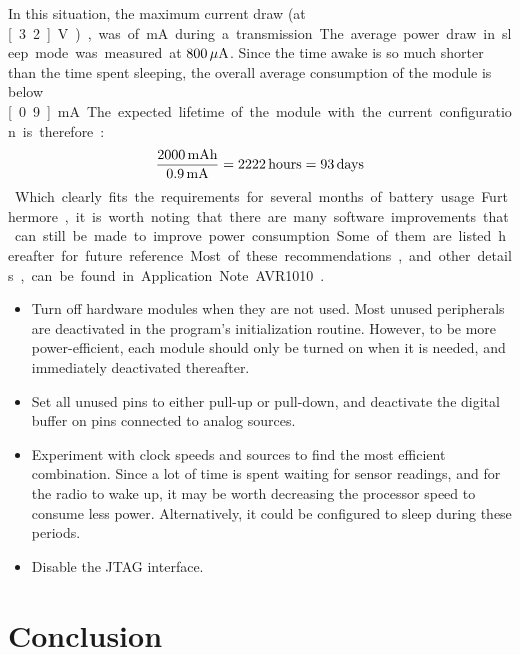 In this situation, the maximum current draw (at \unit[3.2]{V}), was of
\unit[20]{mA} during a transmission. The average power draw in sleep mode was
measured at $\unit[800]{\mu{}A}$. Since the time awake is so much shorter than
the time spent sleeping, the overall average consumption of the module is below
\unit[0.9]{mA}. The expected lifetime of the module with the current
configuration is therefore : 

\begin{equation}
  \frac{\unit[2000]{mAh}}{\unit[0.9]{mA}} = \unit[2222]{hours} = \unit[93]{days}
  \label{eq:env-sensors-consumption}
\end{equation}

Which clearly fits the requirements for several months of battery usage.
Furthermore, it is worth noting that there are many software improvements that
can still be made to improve power consumption. Some of them are listed
hereafter for
future reference. Most of these recommendations, and other details, can be found
in Application Note AVR1010\cite{avr1010}.

\begin{itemize}
  \item Turn off hardware modules when they are not used. Most unused
    peripherals are deactivated in the program's initialization routine.
    However, to be more power-efficient, each module should only be turned on
    when it is needed, and immediately deactivated thereafter.
  \item Set all unused pins to either pull-up or pull-down, and deactivate the
    digital buffer on pins connected to analog sources.
  \item Experiment with clock speeds and sources to find the most efficient
    combination. Since a lot of time is spent waiting for sensor readings, and
    for the radio to wake up, it may be worth decreasing the processor speed to
    consume less power. Alternatively, it could be configured to sleep during
    these periods.
  \item Disable the JTAG interface.

\end{itemize}



\section{Conclusion}


